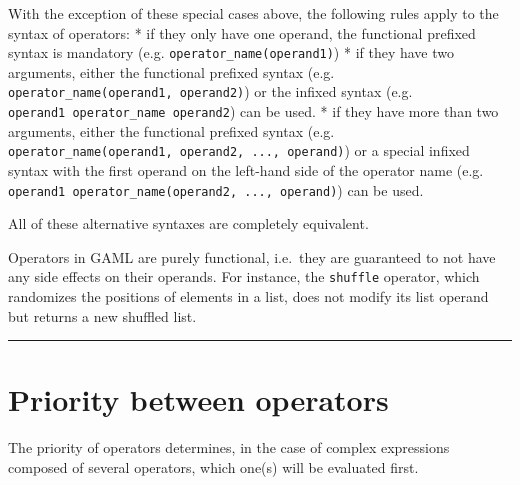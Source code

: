 \documentclass[]{book}
\theoremstyle{definition}
\theoremstyle{definition}
\theoremstyle{definition}
\theoremstyle{remark}
\begin{document}
With the exception of these special cases above, the following rules
apply to the syntax of operators: * if they only have one operand, the
functional prefixed syntax is mandatory (e.g.
\texttt{operator\_name(operand1)}) * if they have two arguments, either
the functional prefixed syntax (e.g.
\texttt{operator\_name(operand1,\ operand2)}) or the infixed syntax
(e.g. \texttt{operand1\ operator\_name\ operand2}) can be used. * if
they have more than two arguments, either the functional prefixed syntax
(e.g. \texttt{operator\_name(operand1,\ operand2,\ ...,\ operand)}) or a
special infixed syntax with the first operand on the left-hand side of
the operator name (e.g.
\texttt{operand1\ operator\_name(operand2,\ ...,\ operand)}) can be
used.

All of these alternative syntaxes are completely equivalent.

Operators in GAML are purely functional, i.e.~they are guaranteed to not
have any side effects on their operands. For instance, the
\texttt{shuffle} operator, which randomizes the positions of elements in
a list, does not modify its list operand but returns a new shuffled
list.

\begin{center}\rule{0.5\linewidth}{\linethickness}\end{center}

\section{Priority between operators}\label{priority-between-operators-1}

The priority of operators determines, in the case of complex expressions
composed of several operators, which one(s) will be evaluated first.
\end{document}
